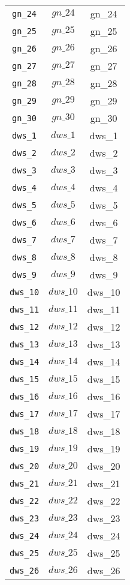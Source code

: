 \begin{center}
\begin{longtable}{ccc}
\texttt{gn\_24} & $gn\_24$ & gn\_24\\
\texttt{gn\_25} & $gn\_25$ & gn\_25\\
\texttt{gn\_26} & $gn\_26$ & gn\_26\\
\texttt{gn\_27} & $gn\_27$ & gn\_27\\
\texttt{gn\_28} & $gn\_28$ & gn\_28\\
\texttt{gn\_29} & $gn\_29$ & gn\_29\\
\texttt{gn\_30} & $gn\_30$ & gn\_30\\
\texttt{dws\_1} & $dws\_1$ & dws\_1\\
\texttt{dws\_2} & $dws\_2$ & dws\_2\\
\texttt{dws\_3} & $dws\_3$ & dws\_3\\
\texttt{dws\_4} & $dws\_4$ & dws\_4\\
\texttt{dws\_5} & $dws\_5$ & dws\_5\\
\texttt{dws\_6} & $dws\_6$ & dws\_6\\
\texttt{dws\_7} & $dws\_7$ & dws\_7\\
\texttt{dws\_8} & $dws\_8$ & dws\_8\\
\texttt{dws\_9} & $dws\_9$ & dws\_9\\
\texttt{dws\_10} & $dws\_10$ & dws\_10\\
\texttt{dws\_11} & $dws\_11$ & dws\_11\\
\texttt{dws\_12} & $dws\_12$ & dws\_12\\
\texttt{dws\_13} & $dws\_13$ & dws\_13\\
\texttt{dws\_14} & $dws\_14$ & dws\_14\\
\texttt{dws\_15} & $dws\_15$ & dws\_15\\
\texttt{dws\_16} & $dws\_16$ & dws\_16\\
\texttt{dws\_17} & $dws\_17$ & dws\_17\\
\texttt{dws\_18} & $dws\_18$ & dws\_18\\
\texttt{dws\_19} & $dws\_19$ & dws\_19\\
\texttt{dws\_20} & $dws\_20$ & dws\_20\\
\texttt{dws\_21} & $dws\_21$ & dws\_21\\
\texttt{dws\_22} & $dws\_22$ & dws\_22\\
\texttt{dws\_23} & $dws\_23$ & dws\_23\\
\texttt{dws\_24} & $dws\_24$ & dws\_24\\
\texttt{dws\_25} & $dws\_25$ & dws\_25\\
\texttt{dws\_26} & $dws\_26$ & dws\_26\\

\end{longtable}
\end{center}
